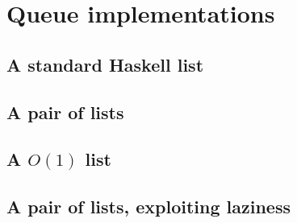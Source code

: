 \section*{Queue implementations}

\subsection*{A standard Haskell list}
\subsection*{A pair of lists}
\subsection*{A $O(1)$ list}
\subsection*{A pair of lists, exploiting laziness}
\subsection*{}